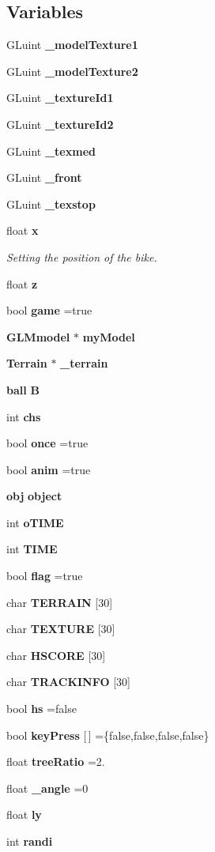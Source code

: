 \subsection*{Variables}
\begin{DoxyCompactItemize}
\item 
G\-Luint {\bf \-\_\-model\-Texture1}
\item 
G\-Luint {\bf \-\_\-model\-Texture2}
\item 
G\-Luint {\bf \-\_\-texture\-Id1}
\item 
G\-Luint {\bf \-\_\-texture\-Id2}
\item 
G\-Luint {\bf \-\_\-texmed}
\item 
G\-Luint {\bf \-\_\-front}
\item 
G\-Luint {\bf \-\_\-texstop}
\item 
float {\bf x}
\begin{DoxyCompactList}\small\item\em Setting the position of the bike. \end{DoxyCompactList}\item 
float {\bf z}
\item 
bool {\bf game} =true
\item 
{\bf G\-L\-Mmodel} $\ast$ {\bf my\-Model}
\item 
{\bf Terrain} $\ast$ {\bf \-\_\-terrain}
\item 
{\bf ball} {\bf B}
\item 
int {\bf chs}
\item 
bool {\bf once} =true
\item 
bool {\bf anim} =true
\item 
{\bf obj} {\bf object}
\item 
int {\bf o\-T\-I\-M\-E}
\item 
int {\bf T\-I\-M\-E}
\item 
bool {\bf flag} =true
\item 
char {\bf T\-E\-R\-R\-A\-I\-N} [30]
\item 
char {\bf T\-E\-X\-T\-U\-R\-E} [30]
\item 
char {\bf H\-S\-C\-O\-R\-E} [30]
\item 
char {\bf T\-R\-A\-C\-K\-I\-N\-F\-O} [30]
\item 
bool {\bf hs} =false
\item 
bool {\bf key\-Press} [$\,$] =\{false,false,false,false\}
\item 
float {\bf tree\-Ratio} =2.
\item 
float {\bf \-\_\-angle} =0
\item 
float {\bf ly}
\item 
int {\bf randi}
\end{DoxyCompactItemize}


